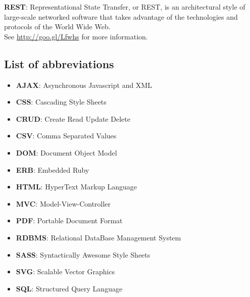 \documentclass{report}
\begin{document}
		\textbf{REST}: Representational State Transfer, or REST, is an architectural style of large-scale networked software that takes advantage of the technologies and protocols of the World Wide Web. \\
See \href{http://goo.gl/Lfwhs}{http://goo.gl/Lfwhs} for more information.

		\subsection{List of abbreviations}
			\begin{itemize}
				\item \textbf{AJAX}: Asynchronous Javascript and XML
				\item \textbf{CSS}: Cascading Style Sheets
				\item \textbf{CRUD}: Create Read Update Delete 
				\item \textbf{CSV}: Comma Separated Values
				\item \textbf{DOM}: Document Object Model
				\item \textbf{ERB}: Embedded Ruby
				\item \textbf{HTML}: HyperText Markup Language
				\item \textbf{MVC}: Model-View-Controller
				\item \textbf{PDF}: Portable Document Format
				\item \textbf{RDBMS}: Relational DataBase Management System
				\item \textbf{SASS}: Syntactically Awesome Style Sheets
				\item \textbf{SVG}: Scalable Vector Graphics
				\item \textbf{SQL}: Structured Query Language
			\end{itemize}
\clearpage
\end{document}
